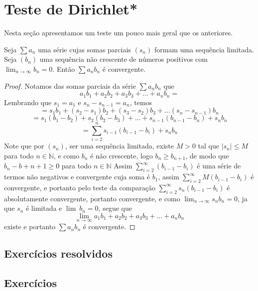 \section{Teste de Dirichlet*}
\construirSec

Nesta seção apresentamos um teste um pouco mais geral que os anteriores.

\begin{teo}
    Seja $\sum a_n$ uma série cujas somas parciais $(s_n)$ formam uma
    sequência limitada. Seja $(b_n)$ uma sequência não crescente de números
    positivos com $\lim_{n \to \infty} b_n = 0$. Então $\sum a_n b_n$ é convergente.
\end{teo}

\begin{proof}
    Notamos das somas parciais da série $\sum a_n b_n$ que
    $$ a_1b_1 +a_2b_2 + a_3b_3 + \dots + a_nb_n=$$
    Lembrando que $s_1 = a_1$ e $s_n -s_{n-1}= a_n$, temos
    $$ = s_1b_1 + (s_2 - s_1)b_2 + (s_3 - s_2)b_3 + \dots (s_n-s_{n-1})b_n$$
    $$ =s_1(b_1 - b_2) + s_2(b_2 - b_3) + \dots +s_{n-1}(b_{n-1}-b_n) + s_nb_n$$
    $$ = \sum_{i=2}^n s_{i-1}(b_{i-1}-b_i) + s_nb_n$$
    Note que por $(s_n)$, ser uma sequência limitada, existe $M>0$ tal que
    $|s_n| \leq M$ para todo $n \in \mathbb{N}$, e como $b_n$ é não crescente, logo
    $b_n \geq b_{n+1}$, de modo que $ b_n -b+{n+1} \geq 0$ para todo $n \in \mathbb{N}$
    Assim $\sum_{i=2}^{\infty} (b_{i-1}-b_i)$ é uma série de termos não negativos
    e convergente cuja soma é $b_1$, assim $\sum_{i=2}^{\infty} M(b_{i-1}-b_i)$
    é convergente, e portanto pelo teste da comparação $\sum_{i=2}^{\infty} 
    s_n(b_{i-1}-b_i)$ é absolutamente convergente, portanto convergente, e como
    $\lim_{n \to \infty} s_n b_n = 0$, ja que $s_n$ é limitada e $\lim{\:}b_n = 0$,
    segue que
    $$ \lim_{n \to \infty} a_1b_1 +a_2b_2 + a_3b_3 + \dots + a_nb_n$$
    existe e portanto $\sum a_n b_n$ é convergente.
\end{proof}
\subsection*{Exercícios resolvidos}

\construirExeresol


\subsection*{Exercícios}

